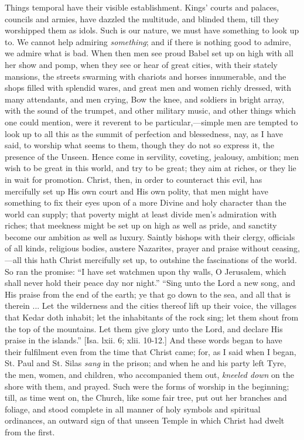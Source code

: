 Things temporal have their visible establishment. Kings' courts and
palaces, councils and armies, have dazzled the multitude, and blinded
them, till they worshipped them as idols. Such is our nature, we must
have something to look up to. We cannot help admiring \emph{something};
and if there is nothing good to admire, we admire what is bad. When
then men see proud Babel set up on high with all her show and pomp,
when they see or hear of great cities, with their stately mansions,
the streets swarming with chariots and horses innumerable, and the
shops filled with splendid wares, and great men and women richly
dressed, with many attendants, and men crying, Bow the knee, and
soldiers in bright array, with the sound of the trumpet, and other
military music, and other things which one could mention, were it
reverent to be particular,—simple men are tempted to look up to all
this as the summit of perfection and blessedness, nay, as I have said,
to worship what seems to them, though they do not so express it, the
presence of the Unseen. Hence come in servility, coveting, jealousy,
ambition; men wish to be great in this world, and try to be great;
they aim at riches, or they lie in wait for promotion. Christ, then,
in order to counteract this evil, has mercifully set up His own court
and His own polity, that men might have something to fix their eyes
upon of a more Divine and holy character than the world can supply;
that poverty might at least divide men's admiration with riches; that
meekness might be set up on high as well as pride, and sanctity become
our ambition as well as luxury. Saintly bishops with their clergy,
officials of all kinds, religious bodies, austere Nazarites, prayer
and praise without ceasing,—all this hath Christ mercifully set up,
to outshine the fascinations of the world. So ran the promise: ``I
have set watchmen upon thy walls, O Jerusalem, which shall never hold
their peace day nor night.'' ``Sing unto the Lord a new song,
and His praise from the end of the earth; ye that go down to the sea,
and all that is therein ... Let the wilderness and the cities thereof
lift up their voice, the villages that Kedar doth inhabit; let the
inhabitants of the rock sing; let them shout from the top of the
mountains. Let them give glory unto the Lord, and declare His praise
in the islands.'' [Isa. lxii. 6; xlii. 10-12.] And these words
began to have their fulfilment even from the time that Christ came;
for, as I said when I began, St. Paul and St. Silas \emph{sang} in the
prison; and when he and his party left Tyre, the men, women, and
children, who accompanied them out, \emph{kneeled down} on the shore
with them, and prayed. Such were the forms of worship in the
beginning; till, as time went on, the Church, like some fair tree, put
out her branches and foliage, and stood complete in all manner of holy
symbols and spiritual ordinances, an outward sign of that unseen
Temple in which Christ had dwelt from the first.

